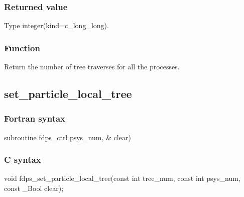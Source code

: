 \subsubsection*{Returned value}
Type integer(kind=c\_long\_long).

\subsubsection*{Function}
Return the number of tree traverses for all the processes.
\clearpage

\subsection{set\_particle\_local\_tree}
\subsubsection*{Fortran syntax}
\begin{screen}
\begin{spverbatim}  
subroutine fdps_ctrl%
                                             psys_num, &
                                             clear)
\end{spverbatim}
\end{screen}

\subsubsection*{C syntax}
\begin{screen}
\begin{spverbatim}  
void fdps_set_particle_local_tree(const int tree_num,                                               
                                  const int psys_num,                                               
                                  const _Bool clear);
\end{spverbatim}
\end{screen}

